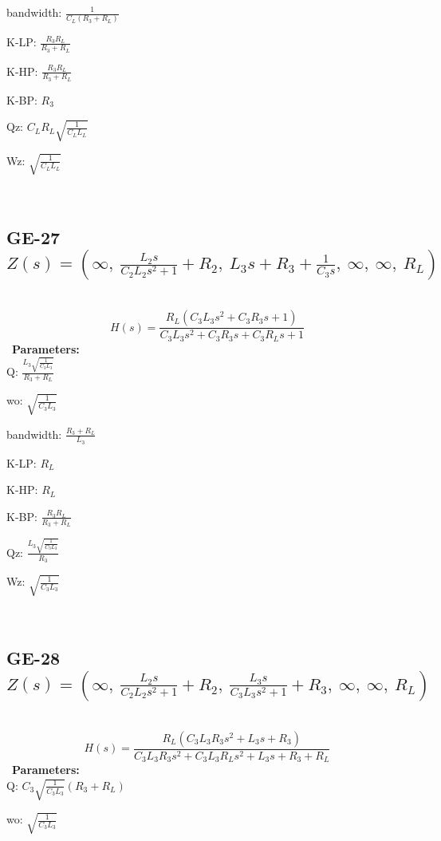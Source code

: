 \documentclass{article}
\begin{document}
bandwidth: $\frac{1}{C_{L} \left(R_{3} + R_{L}\right)}$\ 

K-LP: $\frac{R_{3} R_{L}}{R_{3} + R_{L}}$\ 

K-HP: $\frac{R_{3} R_{L}}{R_{3} + R_{L}}$\ 

K-BP: $R_{3}$\ 

Qz: $C_{L} R_{L} \sqrt{\frac{1}{C_{L} L_{L}}}$\ 

Wz: $\sqrt{\frac{1}{C_{L} L_{L}}}$\ 

\ 

\subsection{GE-27 $Z(s) = \left( \infty, \  \frac{L_{2} s}{C_{2} L_{2} s^{2} + 1} + R_{2}, \  L_{3} s + R_{3} + \frac{1}{C_{3} s}, \  \infty, \  \infty, \  R_{L}\right)$ } \ 
\textbf{\[H(s) = \frac{R_{L} \left(C_{3} L_{3} s^{2} + C_{3} R_{3} s + 1\right)}{C_{3} L_{3} s^{2} + C_{3} R_{3} s + C_{3} R_{L} s + 1}\] } \ 
\textbf{Parameters:}\\ 

Q: $\frac{L_{3} \sqrt{\frac{1}{C_{3} L_{3}}}}{R_{3} + R_{L}}$\ 

wo: $\sqrt{\frac{1}{C_{3} L_{3}}}$\ 

bandwidth: $\frac{R_{3} + R_{L}}{L_{3}}$\ 

K-LP: $R_{L}$\ 

K-HP: $R_{L}$\ 

K-BP: $\frac{R_{3} R_{L}}{R_{3} + R_{L}}$\ 

Qz: $\frac{L_{3} \sqrt{\frac{1}{C_{3} L_{3}}}}{R_{3}}$\ 

Wz: $\sqrt{\frac{1}{C_{3} L_{3}}}$\ 

\ 

\subsection{GE-28 $Z(s) = \left( \infty, \  \frac{L_{2} s}{C_{2} L_{2} s^{2} + 1} + R_{2}, \  \frac{L_{3} s}{C_{3} L_{3} s^{2} + 1} + R_{3}, \  \infty, \  \infty, \  R_{L}\right)$ } \ 
\textbf{\[H(s) = \frac{R_{L} \left(C_{3} L_{3} R_{3} s^{2} + L_{3} s + R_{3}\right)}{C_{3} L_{3} R_{3} s^{2} + C_{3} L_{3} R_{L} s^{2} + L_{3} s + R_{3} + R_{L}}\] } \ 
\textbf{Parameters:}\\ 

Q: $C_{3} \sqrt{\frac{1}{C_{3} L_{3}}} \left(R_{3} + R_{L}\right)$\ 

wo: $\sqrt{\frac{1}{C_{3} L_{3}}}$\ 
\end{document}
